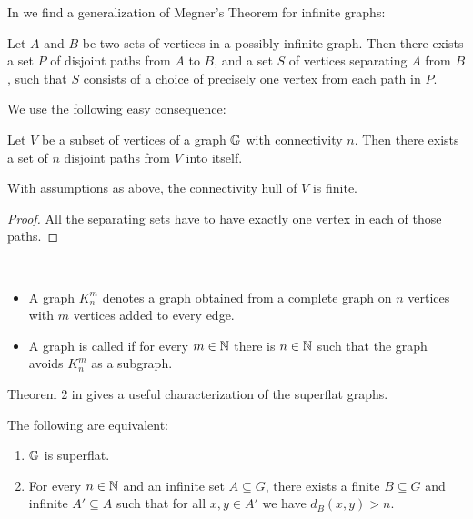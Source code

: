 In \cite{infinite_megner} we find a generalization of Megner's Theorem for infinite graphs:

\begin{Theorem}
  Let $A$ and $B$ be two sets of vertices in a possibly infinite graph. Then there exists a set $P$ of disjoint paths from $A$ to $B$, and a set $S$ of vertices separating $A$ from $B$, such that $S$ consists of a choice of precisely one vertex from each path in $P$.
\end{Theorem}

We use the following easy consequence:

\begin{Corollary} \label{cr_disjoint_paths}
  Let $V$ be a subset of vertices of a graph $\mathbb G$ with connectivity $n$. Then there exists a set of $n$ disjoint paths from $V$ into itself.
\end{Corollary}

\begin{Corollary} \label{cr_hull_finite}
  With assumptions as above, the connectivity hull of $V$ is finite.
\end{Corollary}

\begin{proof}
  All the separating sets have to have exactly one vertex in each of those paths. 
\end{proof}

\begin{Definition} \ 
  \begin{itemize}
    \item A graph $K^m_n$ denotes a graph obtained from a complete graph on $n$ vertices with $m$ vertices added to every edge.
    \item A graph is called \defn{superflat} if for every $m \in \mathbb{N}$ there is $n \in \mathbb{N}$ such that the graph avoids $K^m_n$ as a subgraph. 
  \end{itemize}
\end{Definition}

Theorem 2 in \cite{stable_graphs} gives a useful characterization of the superflat graphs.

\begin{Theorem} \label{th_superflat_equivalence}
  The following are equivalent:
  \begin{enumerate}
  \item $\mathbb G$ is superflat.
  \item For every $n \in \mathbb{N}$ and an infinite set $A \subseteq G$, there exists a finite $B \subseteq G$ and infinite $A' \subseteq A$ such that for all $x,y \in A'$ we have $d_{B}(x, y) > n$.
  \end{enumerate}
\end{Theorem}

